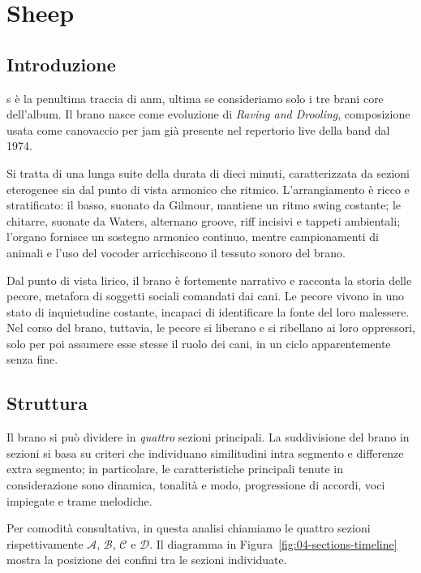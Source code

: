 \documentclass[class=book, crop=false, oneside, 12pt]{standalone}
\begin{document}
    \chapter{Sheep}

    \section{Introduzione}
    \label{sec:04-intro}

    \acrlong{s} è la penultima traccia di \acrshort{anm}, ultima se consideriamo solo i tre brani core dell'album. 
    Il brano nasce come evoluzione di \emph{Raving and Drooling}, composizione usata come canovaccio per jam già presente nel repertorio live della band dal 1974.
    
    Si tratta di una lunga suite della durata di dieci minuti, caratterizzata da sezioni eterogenee sia dal punto di vista armonico che ritmico. L'arrangiamento è ricco e stratificato: il basso, suonato da Gilmour, mantiene un ritmo swing costante; le chitarre, suonate da Waters, alternano groove, riff incisivi e tappeti ambientali; l'organo fornisce un sostegno armonico continuo, mentre campionamenti di animali e l'uso del vocoder arricchiscono il tessuto sonoro del brano.

    Dal punto di vista lirico, il brano è fortemente narrativo e racconta la storia delle pecore, metafora di soggetti sociali comandati dai cani. Le pecore vivono in uno stato di inquietudine costante, incapaci di identificare la fonte del loro malessere. Nel corso del brano, tuttavia, le pecore si liberano e si ribellano ai loro oppressori, solo per poi assumere esse stesse il ruolo dei cani, in un ciclo apparentemente senza fine.

    \section{Struttura}
    \label{sec:04-struttura}

    Il brano si può dividere in \emph{quattro} sezioni principali.
    La suddivisione del brano in sezioni si basa su criteri che individuano similitudini intra segmento e differenze extra segmento; in particolare, le caratteristiche principali tenute in considerazione sono dinamica, tonalità e modo, progressione di accordi, voci impiegate e trame melodiche.

    Per comodità consultativa, in questa analisi chiamiamo le quattro sezioni rispettivamente \(\mathcal{A}\), \(\mathcal{B}\), \(\mathcal{C}\) e \(\mathcal{D}\). Il diagramma in Figura~\ref{fig:04-sections-timeline} mostra la posizione dei confini tra le sezioni individuate.
\end{document}
